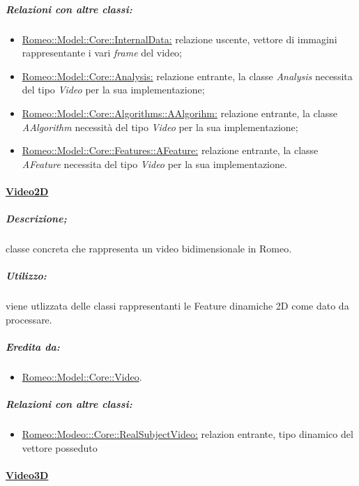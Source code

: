 			\subparagraph{Relazioni con altre classi:}
				\begin{itemize}
					\item \hyperref[]{Romeo::Model::Core::InternalData:} relazione uscente, vettore di immagini rappresentante i vari \emph{frame} del video;
					
					\item \hyperref[]{Romeo::Model::Core::Analysis:} relazione entrante, la classe \textsl{Analysis} necessita del tipo \textsl{Video} per la sua implementazione;
										
					\item \hyperref[]{Romeo::Model::Core::Algorithms::AAlgorihm:} relazione entrante, la classe \textsl{AAlgorithm} necessità del tipo \textsl{Video} per la sua implementazione;
					
					\item \hyperref[]{Romeo::Model::Core::Features::AFeature:} relazione entrante, la classe \textsl{AFeature} necessita del tipo \textsl{Video} per la sua implementazione.
					
				\end{itemize}
		
		\paragraph{\underline{Video2D}}
		\label{video2d}
		
			\subparagraph{Descrizione;} classe concreta che rappresenta un video bidimensionale in Romeo\g{}.
			
			\subparagraph{Utilizzo:} viene utlizzata delle classi rappresentanti le Feature\g{} dinamiche 2D come dato da processare.
			
			\subparagraph{Eredita da:}
				\begin{itemize}
					\item \hyperref[]{Romeo::Model::Core::Video}.
				\end{itemize}
				
			\subparagraph{Relazioni con altre classi:}
				\begin{itemize}
					\item \hyperref[]{Romeo::Modeo:::Core::RealSubjectVideo:} relazion entrante, tipo dinamico del vettore posseduto
				\end{itemize}
			
		\paragraph{\underline{Video3D}}
		
